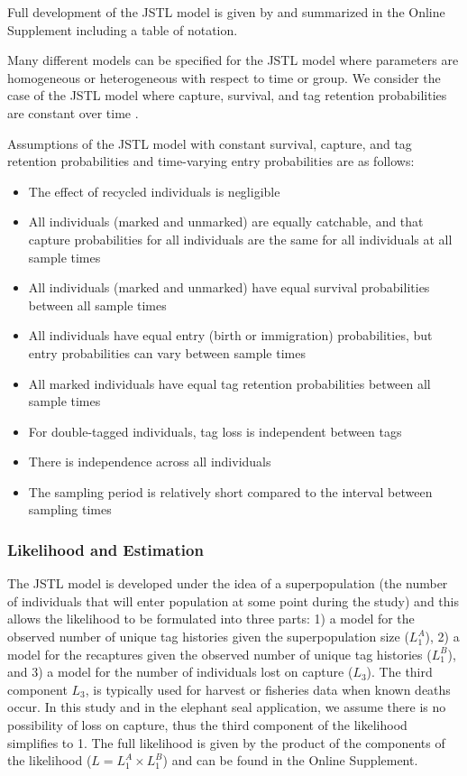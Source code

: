 \documentclass[12pt]{article}
\providecommand{\tightlist}{%
  \setlength{\itemsep}{0pt}\setlength{\parskip}{0pt}}
\begin{document}
Full development of the JSTL model is given by \citep{Cowen:2006} and summarized in the Online Supplement including a table of notation.  

Many different models can be specified for the JSTL model where
parameters are homogeneous or heterogeneous with respect to time or
group. We consider the case of the JSTL model where capture, survival,
and tag retention probabilities are constant over time \citep{Cowen:2006}. 

Assumptions of the JSTL model with constant survival, capture, and tag
retention probabilities and time-varying entry probabilities are as
follows:

\begin{itemize}
\tightlist
\item
  The effect of recycled individuals is negligible
\item
  All individuals (marked and unmarked) are equally catchable, and that
  capture probabilities for all individuals are the same for all
  individuals at all sample times
\item
  All individuals (marked and unmarked) have equal survival
  probabilities between all sample times
\item
  All individuals have equal entry (birth or immigration) probabilities,
  but entry probabilities can vary between sample times
\item
  All marked individuals have equal tag retention probabilities between
  all sample times
\item
  For double-tagged individuals, tag loss is independent between tags
\item
  There is independence across all individuals
\item
  The sampling period is relatively short compared to the interval
  between sampling times
\end{itemize}

\subsubsection{Likelihood and
Estimation}\label{likelihood-and-estimation}
The JSTL model is developed under the idea of a superpopulation (the number of individuals that will enter population at some point during the study) \citep{Schwarz:1996} and this allows the likelihood to be formulated into three parts: 1) a model for the observed number of unique tag histories given the superpopulation size ($L_1^A$), 2) a model for the recaptures given the observed number of unique tag histories ($L_1^B$), and 3) a model for the number of individuals lost on capture ($L_3$).  The third component $L_3$, is typically used for harvest or fisheries data when known deaths occur.  In this study and in the elephant seal application, we assume there is no possibility of loss on capture, thus the third component of the likelihood simplifies to 1. The
full likelihood is given by the product of the components of the
likelihood (\(L=L_1^A \times L_1^B\)) and can be found in the Online Supplement.
\end{document}
